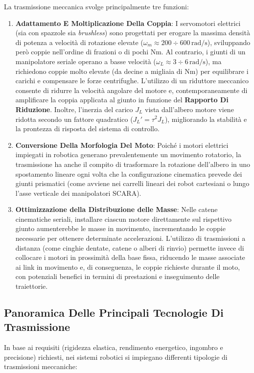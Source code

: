 ﻿\documentclass[11pt, a4paper]{article}
\begin{document}
La trasmissione meccanica svolge principalmente tre funzioni:
\begin{enumerate}
    \item \textbf{Adattamento E Moltiplicazione Della Coppia}: I servomotori elettrici (sia con spazzole sia \textit{brushless}) sono progettati per erogare la massima densità di potenza a velocità di rotazione elevate ($\omega_m \approx 200 \div 600\,\si{\radian\per\second}$), sviluppando però coppie nell'ordine di frazioni o di pochi $\si{\newton\meter}$. Al contrario, i giunti di un manipolatore seriale operano a basse velocità ($\omega_L \approx 3 \div 6\,\si{\radian\per\second}$), ma richiedono coppie molto elevate (da decine a migliaia di $\si{\newton\meter}$) per equilibrare i carichi e compensare le forze centrifughe. L'utilizzo di un riduttore meccanico consente di ridurre la velocità angolare del motore e, contemporaneamente di amplificare la coppia applicata al giunto in funzione del \textbf{Rapporto Di Riduzione}. Inoltre, l'inerzia del carico $J_L$ vista dall'albero motore viene ridotta secondo un fattore quadratico ($J_L' = \tau^2 J_L$), migliorando la stabilità e la prontezza di risposta del sistema di controllo.

    \item \textbf{Conversione Della Morfologia Del Moto}: Poiché i motori elettrici impiegati in robotica generano prevalentemente un movimento rotatorio, la trasmissione ha anche il compito di trasformare la rotazione dell'albero in uno spostamento lineare ogni volta che la configurazione cinematica prevede dei giunti prismatici (come avviene nei carrelli lineari dei robot cartesiani o lungo l'asse verticale dei manipolatori SCARA).

     \item \textbf{Ottimizzazione della Distribuzione delle Masse}: Nelle catene cinematiche seriali, installare ciascun motore direttamente sul rispettivo giunto aumenterebbe le masse in movimento, incrementando le coppie necessarie per ottenere determinate accelerazioni. L'utilizzo di trasmissioni a distanza (come cinghie dentate, catene o alberi di rinvio) permette invece di collocare i motori in prossimità della base fissa, riducendo le masse associate ai link in movimento e, di conseguenza, le coppie richieste durante il moto, con potenziali benefici in termini di prestazioni e inseguimento delle traiettorie.
\end{enumerate}
\newpage
\subsection{Panoramica Delle Principali Tecnologie Di Trasmissione}
In base ai requisiti (rigidezza elastica, rendimento energetico, ingombro e precisione) richiesti, nei sistemi robotici si impiegano differenti tipologie di trasmissioni meccaniche:
\end{document}
